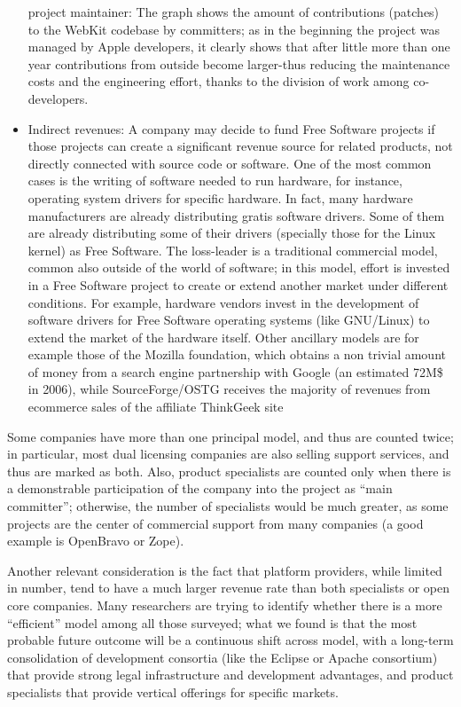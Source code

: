 \begin{itemize}
project maintainer:  The graph shows the amount of contributions
(patches) to the WebKit codebase by committers; as in the beginning the project
was managed by Apple developers, it clearly shows that after little more than
one year contributions from outside become larger-thus reducing the maintenance
costs and the engineering effort, thanks to the division of work among
co-developers.
 \item Indirect revenues: A company may decide to fund Free Software projects if
those projects can create a significant revenue source for related products, not
directly connected with source code or software. One of the most common cases is
the writing of software needed to run hardware, for instance, operating system
drivers for specific hardware. In fact, many hardware manufacturers are already
distributing gratis software drivers. Some of them are already distributing some
of their drivers (specially those for the Linux kernel) as Free Software. The
loss-leader is a traditional commercial model, common also outside of the world
of software; in this model, effort is invested in a Free Software project to
create or extend another market under different conditions. For example,
hardware vendors invest in the development of software drivers for Free Software
operating systems (like GNU/Linux) to extend the market of the hardware itself.
Other ancillary models are for example those of the Mozilla foundation, which
obtains a non trivial amount of money from a search engine partnership with
Google (an estimated 72M\$ in 2006), while SourceForge/OSTG receives the
majority of revenues from ecommerce sales of the affiliate ThinkGeek site
\end{itemize}

Some companies have more than one principal model, and thus are counted twice;
in particular, most dual licensing companies are also selling support services,
and thus are marked as both. Also, product specialists are counted only when
there is a demonstrable participation of the company into the project as ``main
committer''; otherwise, the number of specialists would be much greater, as some
projects are the center of commercial support from many companies (a good
example is OpenBravo or Zope).

Another relevant consideration is the fact that platform providers, while
limited in number, tend to have a much larger revenue rate than both specialists
or open core companies. Many researchers are trying to identify whether there is
a more ``efficient'' model among all those surveyed; what we found is that the
most probable future outcome will be a continuous shift across model, with a
long-term consolidation of development consortia (like the Eclipse or Apache
consortium) that provide strong legal infrastructure and development advantages,
and product specialists that provide vertical offerings for specific markets. 

